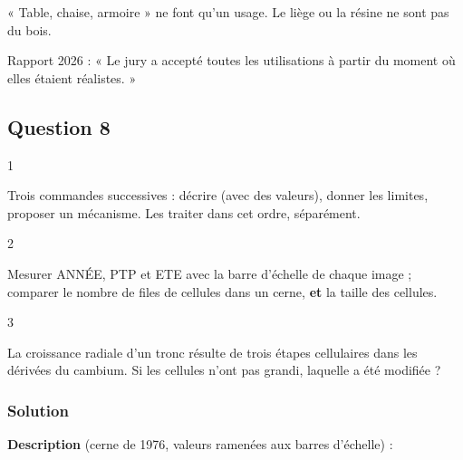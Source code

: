 \documentclass[11pt,a4paper]{article}
\begin{document}
\begin{piege}

« Table, chaise, armoire » ne font qu'un usage. Le liège ou la résine ne sont pas du bois.

\end{piege}

\begin{jury}

Rapport 2026 : « Le jury a accepté toutes les utilisations à partir du moment où elles étaient réalistes. »

\end{jury}

\hypertarget{question-8}{%
\subsection{Question 8}\label{question-8}}

\begin{indication}{1}

Trois commandes successives : décrire (avec des valeurs), donner les limites, proposer un mécanisme. Les traiter dans cet ordre, séparément.

\end{indication}

\begin{indication}{2}

Mesurer ANNÉE, PTP et ETE avec la barre d'échelle de chaque image ; comparer le nombre de files de cellules dans un cerne, \textbf{et} la taille des cellules.

\end{indication}

\begin{indication}{3}

La croissance radiale d'un tronc résulte de trois étapes cellulaires dans les dérivées du cambium. Si les cellules n'ont pas grandi, laquelle a été modifiée ?

\end{indication}

\hypertarget{solution-7}{%
\subsubsection{Solution}\label{solution-7}}

\textbf{Description} (cerne de 1976, valeurs ramenées aux barres d'échelle) :
\end{document}
